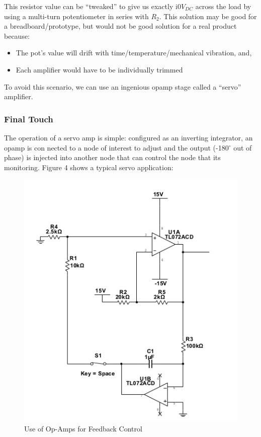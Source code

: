 \documentclass[journal]{IEEEtran}
\begin{document}
This resistor value can be “tweaked” to give us exactly i$0 V_{DC}$ across the load by using a multi-turn
potentiometer in series with $R_{2}$. This solution may be good for a breadboard/prototype, but would
not be good solution for a real product because:

\begin{itemize}
\item
The pot’s value will drift with time/temperature/mechanical vibration, and,
\item
Each amplifier would have to be individually trimmed
\end{itemize}

To avoid this scenario, we can use an ingenious opamp stage called a ``servo'' amplifier.

\subsubsection{Final Touch}

The operation of a servo amp is simple: configured as an inverting integrator, an opamp is con
nected to a node of interest to adjust and the output (-180$^{\circ}$ out of phase) is injected into another
node that can control the node that its monitoring. Figure 4 shows a typical servo application:

\begin{figure}[H]
\centering
\includegraphics[scale=.6]{servo-app.png}
\caption{Use of Op-Amps for Feedback Control}
\label{fig_op_amp_demo}
\end{figure}
\end{document}

